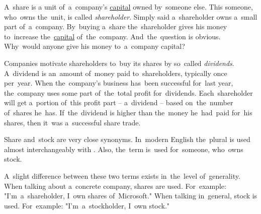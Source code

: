 \label{shares}
A~share is a unit of~a~company's \hyperref[capital]{capital} owned by~someone else.
This someone, who~owns the~unit, is called \textit{shareholder}.
Simply said a~shareholder owns a~small part of~a~company.
By~buying a~share the~shareholder gives his money to~increase the~\hyperref[capital]{capital} of~the~company.
And~the~question is obvious.
Why~would anyone give his money to~a~company capital?

Companies motivate shareholders to~buy its shares by so~called \textit{dividends}.
A~dividend is an~amount of~money paid to~shareholders, typically once per~year.
When the~company's business has~been successful for~last year, the~company uses some part of~the~total profit for~dividends.
Each~shareholder will get a~portion of~this profit part -- a~dividend -- based on~the~number of~shares he~has.
If~the~dividend is higher than the~money he~had~paid for~his shares, then it~was a~successful share trade.

Share and~stock are very close synonyms.
In~modern English the~plural  is used almost interchangeably with .
Also, the~term  is~used for~someone, who~owns stock.

A~slight difference between these two terms exists in~the~level of~generality.
When talking about a~concrete company, shares are used.
For~example:
"I'm~a~shareholder, I~own shares of~Microsoft."
When talking in~general, stock is used.
For~example:
"I'm~a~stockholder, I~own stock."
